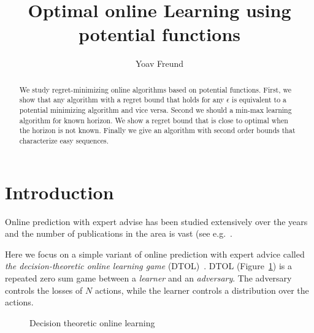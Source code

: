 \documentclass{article}[12pt]
\title{Optimal online Learning using potential functions}
\author{Yoav Freund}
\begin{document}
\maketitle
\begin{abstract}
  We study regret-minimizing online algorithms based on potential
functions. First, we show that any algorithm with a regret bound that
holds for any $\epsilon$ is equivalent to a potential minimizing
algorithm and vice versa. Second we should a min-max learning
algorithm for known horizon. We show a regret bound that is close to
optimal when the horizon is not known. Finally we give an algorithm
with second order bounds that characterize easy sequences.
\end{abstract}

\section{Introduction}
Online prediction with expert advise has been studied extensively over
the years and the number of publications in the area is vast (see
e.g.~\cite{vovk1990aggregating, feder1992universal,
  littlestone1994weighted, cesa1997use, cesa2006prediction}.

Here we focus on a simple variant of online prediction with expert
advice called {\em the decision-theoretic online learning game}
(DTOL)~\cite{freund1997decision}. DTOL (Figure~\ref{fig:DTOL}) is a
repeated zero sum game between a {\em learner} and an {\em
  adversary}. The adversary controls the losses of $N$ actions, while
the learner controls a distribution over the actions.

\begin{figure}[ht!]
\caption{Decision theoretic online learning \label{fig:DTOL}}
\end{figure}
\end{document}
